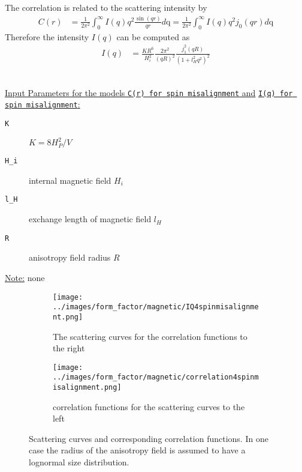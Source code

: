 The correlation is related to the scattering intensity by
\begin{align}
C(r) &= \frac{1}{2\pi^2} \int_0^\infty I(q) q^2
\frac{\sin(qr)}{qr}d\text{q}
 = \frac{1}{2\pi^2} \int_0^\infty I(q) q^2 j_0(qr) d\text{q}
\end{align}
Therefore the intensity $I(q)$ can be
computed as
\begin{align}
I(q) & = \frac{K R^6}{H_i^2}
\frac{2\pi^2}{\left(qR\right)^2}\frac{j_1^2(qR)}{\left(1+l_H^2q^2\right)^2}
\end{align}

\vspace{5mm}

\hspace{1pt}\\
\underline{Input Parameters for the models \texttt{C(r) for spin
misalignment} and} \newline \underline{\texttt{I(q) for spin misalignment}:}\\
\begin{description}
\item[\texttt{K}] $K=8H^2_P/V$
\item[\texttt{H\_i}] internal magnetic field $H_i$
\item[\texttt{l\_H}] exchange length of magnetic field $l_H$
\item[\texttt{R}] anisotropy field radius $R$
\end{description}

\noindent\underline{Note:}
none


\begin{figure}[htb]

\begin{subfigure}[b]{0.48\textwidth}
   \centering
   \texttt{[image: ../images/form\_factor/magnetic/IQ4spinmisalignment.png]}
   \caption{The scattering curves for the correlation functions to the right}
   \label{fig:MagSpinMisAlignment1}
\end{subfigure}
\hfill
\begin{subfigure}[b]{0.48\textwidth}
   \centering
   \texttt{[image: ../images/form\_factor/magnetic/correlation4spinmisalignment.png]}
   \caption{correlation functions for the scattering curves to the left}
   \label{fig:MagSpinMisAlignment2}
\end{subfigure}
\caption{Scattering curves and corresponding correlation functions.
In one case the radius of the anisotropy field is assumed to have a
lognormal size distribution.} \label{fig:MagSpinMisAlignment}
\end{figure}


